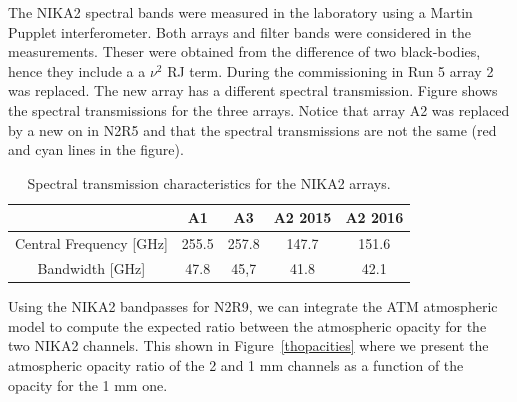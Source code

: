 The NIKA2 spectral bands were measured in the laboratory using a Martin Pupplet interferometer.
Both arrays and filter bands were considered in the measurements. Theser were obtained from the difference of two black-bodies, hence they include a a $\nu^2$ RJ term. During the commissioning in Run 5 array 2 was replaced. The new array has a different spectral transmission. Figure shows the spectral transmissions for the three arrays. Notice that array A2 was replaced by a new on in N2R5 and that the spectral transmissions are not the same (red and cyan lines in the figure).


\begin{table}[h]
\caption{Spectral transmission characteristics for the NIKA2 arrays.%
\label{nika2runs}}
\begin{tabular}{|c|c|c|c|c|}
\hline 
  &     A1  &  A3 &  A2 2015 & A2 2016 \\ 
\hline 
Central Frequency [GHz] &   255.5  & 257.8   &   147.7  & 151.6 \\  
Bandwidth [GHz]         &   47.8   & 45,7    &   41.8   & 42.1 \\
\hline 
\end{tabular} 
\end{table} 



Using the NIKA2 bandpasses for N2R9, we can integrate the ATM atmospheric model to compute the expected ratio between the atmospheric opacity for the two NIKA2 channels. This shown in Figure~\ref{thopacities} where we present the atmospheric opacity ratio of the 2 and 1 mm channels as a function of the opacity for the 1 mm one.

